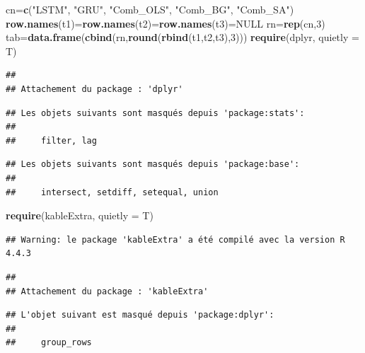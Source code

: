 \documentclass[
]{article}
\newenvironment{Shaded}{\begin{snugshade}}{\end{snugshade}}
\newcommand{\AttributeTok}[1]{\textcolor[rgb]{0.13,0.29,0.53}{#1}}
\newcommand{\ConstantTok}[1]{\textcolor[rgb]{0.56,0.35,0.01}{#1}}
\newcommand{\DecValTok}[1]{\textcolor[rgb]{0.00,0.00,0.81}{#1}}
\newcommand{\FunctionTok}[1]{\textcolor[rgb]{0.13,0.29,0.53}{\textbf{#1}}}
\newcommand{\NormalTok}[1]{#1}
\newcommand{\OtherTok}[1]{\textcolor[rgb]{0.56,0.35,0.01}{#1}}
\newcommand{\StringTok}[1]{\textcolor[rgb]{0.31,0.60,0.02}{#1}}
\begin{document}
\begin{Shaded}
\begin{Highlighting}[]
\NormalTok{cn}\OtherTok{=}\FunctionTok{c}\NormalTok{(}\StringTok{"LSTM"}\NormalTok{, }\StringTok{"GRU"}\NormalTok{, }\StringTok{"Comb\_OLS"}\NormalTok{, }\StringTok{"Comb\_BG"}\NormalTok{, }\StringTok{"Comb\_SA"}\NormalTok{)}
\FunctionTok{row.names}\NormalTok{(t1)}\OtherTok{=}\FunctionTok{row.names}\NormalTok{(t2)}\OtherTok{=}\FunctionTok{row.names}\NormalTok{(t3)}\OtherTok{=}\ConstantTok{NULL}
\NormalTok{rn}\OtherTok{=}\FunctionTok{rep}\NormalTok{(cn,}\DecValTok{3}\NormalTok{)}
\NormalTok{tab}\OtherTok{=}\FunctionTok{data.frame}\NormalTok{(}\FunctionTok{cbind}\NormalTok{(rn,}\FunctionTok{round}\NormalTok{(}\FunctionTok{rbind}\NormalTok{(t1,t2,t3),}\DecValTok{3}\NormalTok{)))}
\FunctionTok{require}\NormalTok{(dplyr, }\AttributeTok{quietly =}\NormalTok{ T)}
\end{Highlighting}
\end{Shaded}

\begin{verbatim}
## 
## Attachement du package : 'dplyr'
\end{verbatim}

\begin{verbatim}
## Les objets suivants sont masqués depuis 'package:stats':
## 
##     filter, lag
\end{verbatim}

\begin{verbatim}
## Les objets suivants sont masqués depuis 'package:base':
## 
##     intersect, setdiff, setequal, union
\end{verbatim}

\begin{Shaded}
\begin{Highlighting}[]
\FunctionTok{require}\NormalTok{(kableExtra, }\AttributeTok{quietly =}\NormalTok{ T)}
\end{Highlighting}
\end{Shaded}

\begin{verbatim}
## Warning: le package 'kableExtra' a été compilé avec la version R 4.4.3
\end{verbatim}

\begin{verbatim}
## 
## Attachement du package : 'kableExtra'
\end{verbatim}

\begin{verbatim}
## L'objet suivant est masqué depuis 'package:dplyr':
## 
##     group_rows
\end{verbatim}
\end{document}
